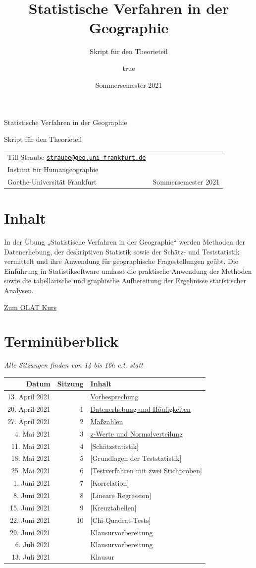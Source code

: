 \documentclass[
  11pt,
  ngerman,
  a4paper,
]{report}
\title{Statistische Verfahren in der Geographie}
\subtitle{Skript für den Theorieteil}
\author{true}
\date{Sommersemester 2021}
\makeatletter
\renewcommand{\maketitle}{
  \newpage
  \begingroup
    \setlength{\parindent}{0pt}
    \setlength{\parskip}{8pt}
    {\fontseries{b}\selectfont\Huge\raggedright{Statistische Verfahren in der Geographie}\par}
    {\fontseries{l}\LARGE\raggedright{Skript für den Theorieteil}\par}

    \vspace{1cm}
    
    \begin{tabularx}{\textwidth}{@{}X r}
                  Till Straube
        \newline \href{mailto:straube@geo.uni-frankfurt.de}{\nolinkurl{straube@geo.uni-frankfurt.de}}
                  \medskip\newline
          {\renewcommand\\{\newline}Institut für Humangeographie\\
Goethe-Universität Frankfurt}
         &
                    Sommersemester 2021
        \end{tabularx}
  \endgroup
  \vspace{1cm}
  \thispagestyle{plain}%
}
\makeatother
\begin{document}
\maketitle

{
\setcounter{tocdepth}{1}
\tableofcontents
}
\hypertarget{inhalt}{%
\chapter*{Inhalt}\label{inhalt}}

In der Übung „Statistische Verfahren in der Geographie`` werden Methoden der Datenerhebung, der deskriptiven Statistik sowie der Schätz- und Teststatistik vermittelt und ihre Anwendung für geographische Fragestellungen geübt. Die Einführung in Statistiksoftware umfasst die praktische Anwendung der Methoden sowie die tabellarische und graphische Aufbereitung der Ergebnisse statistischer Analysen.

\href{https://olat-ce.server.uni-frankfurt.de/olat/auth/RepositoryEntry/10811179011}{Zum OLAT Kurs}

\hypertarget{terminuxfcberblick}{%
\chapter*{Terminüberblick}\label{terminuxfcberblick}}

\emph{Alle Sitzungen finden von 14 bis 16h c.t. statt}

\begin{longtable}[]{@{}rrl@{}}
\toprule
Datum & Sitzung & Inhalt \\
\midrule
\endhead
13. April 2021 & & \protect\hyperlink{vorbesprechung}{Vorbesprechung} \\
20. April 2021 & 1 & \protect\hyperlink{datenerhebung-und-huxe4ufigkeiten}{Datenerhebung und Häufigkeiten} \\
27. April 2021 & 2 & \protect\hyperlink{mauxdfzahlen}{Maßzahlen} \\
4. Mai 2021 & 3 & \protect\hyperlink{z-werte-und-normalverteilung}{z-Werte und Normalverteilung} \\
11. Mai 2021 & 4 & {[}Schätzstatistik{]} \\
18. Mai 2021 & 5 & {[}Grundlagen der Teststatistik{]} \\
25. Mai 2021 & 6 & {[}Testverfahren mit zwei Stichproben{]} \\
1. Juni 2021 & 7 & {[}Korrelation{]} \\
8. Juni 2021 & 8 & {[}Lineare Regression{]} \\
15. Juni 2021 & 9 & {[}Kreuztabellen{]} \\
22. Juni 2021 & 10 & {[}Chi-Quadrat-Tests{]} \\
29. Juni 2021 & & Klausurvorbereitung \\
6. Juli 2021 & & Klausurvorbereitung \\
13. Juli 2021 & & Klausur \\
\bottomrule
\end{longtable}
\end{document}
